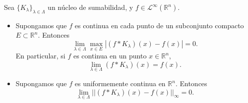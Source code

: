 \begin{teorema} \label{contnuc}
    Sea $\{K_{\lambda}\}_{\lambda \in \Lambda}$ un núcleo de sumabilidad, y $f \in \mathscr{L}^{\infty}(\mathbb{R}^n)$.
    \begin{itemize}
        \item Supongamos que $f$ es continua en cada punto de un subconjunto compacto $E \subset \mathbb{R}^n$. Entonces
        \begin{equation}
            \lim_{\lambda  \in \Lambda} \max_{x \in E} |(f*K_{\lambda})(x)-f(x)|=0.
        \end{equation}
        En particular, si $f$ es continua en un punto $x \in \mathbb{R}^n$,
         \begin{equation}\label{punt}
            \lim_{\lambda  \in \Lambda} (f*K_{\lambda})(x)=f(x).
        \end{equation}
        \item Supongamos que $f$ es uniformemente continua en $\mathbb{R}^n$. Entonces
        \begin{equation}
            \lim_{\lambda  \in \Lambda} ||(f*K_{\lambda})(x)-f(x)||_{\infty}=0.
        \end{equation}
    \end{itemize}
\end{teorema}
